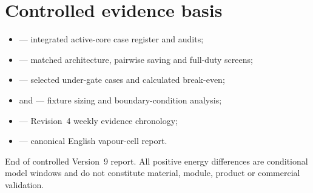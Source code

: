 \documentclass[10pt,a4paper]{article}
\newcommand{\sans}{\fontfamily{qhv}\selectfont}
\begin{document}
\section{Controlled evidence basis}
\begin{itemize}
  \item {} --- integrated active-core case register and audits;
  \item {} --- matched architecture, pairwise saving and full-duty screens;
  \item {} --- selected under-gate cases and calculated break-even;
  \item {} and  --- fixture sizing and boundary-condition analysis;
  \item {} --- Revision~4 weekly evidence chronology;
  \item {} --- canonical English vapour-cell report.
\end{itemize}

\vfill
{\sans\scriptsize\color{Slate}End of controlled Version~9 report. All
positive energy differences are conditional model windows and do not
constitute material, module, product or commercial validation.}
\end{document}
